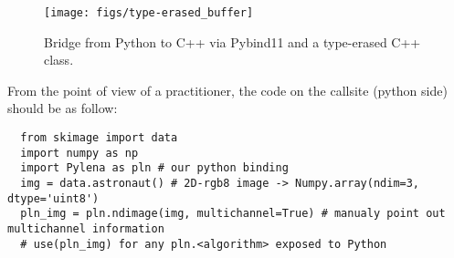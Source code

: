 \begin{figure}[tbh]
  \centering
  \texttt{[image: figs/type-erased\_buffer]}
  \caption{Bridge from Python to C++ via Pybind11 and a type-erased C++ class.}
  \label{fig:type-erased.buffer}
\end{figure}

From the point of view of a practitioner, the code on the callsite (python side) should be as follow:
\begin{verbatim}
  from skimage import data
  import numpy as np
  import Pylena as pln # our python binding
  img = data.astronaut() # 2D-rgb8 image -> Numpy.array(ndim=3, dtype='uint8')
  pln_img = pln.ndimage(img, multichannel=True) # manualy point out multichannel information
  # use(pln_img) for any pln.<algorithm> exposed to Python
\end{verbatim}

